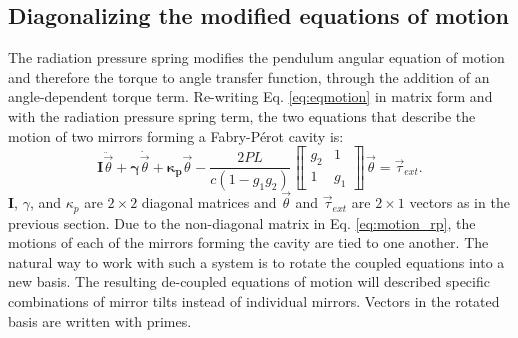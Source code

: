 \subsection{Diagonalizing the modified equations of motion}
The radiation pressure spring modifies the pendulum angular equation
of motion and therefore the torque to angle transfer function,
through the addition of an angle-dependent torque term. Re-writing
Eq. \ref{eq:eqmotion} in matrix form and with the radiation pressure
spring term, the two equations that describe the motion of two mirrors
forming a Fabry-P\'{e}rot cavity is: 
\begin{equation}
\mathbf{I} \ddot{\vec{\theta}} 
+ {\bm \gamma} \dot{\vec{\theta}} 
+ \mathbf{\kappa_p} \vec{\theta}
- \frac{2 P L}{c (1-g_1 g_2)}
\left\llbracket \begin{array}{cc}
g_2 & 1\\
1 & g_1\end{array} \right\rrbracket \vec{\theta} 
= \vec{\tau}_{ext}.
\label{eq:motion_rp}
\end{equation}
$\mathbf{I}$, $\gamma$, and $\kappa_p$ are $2 \times 2$ diagonal
matrices and $\vec{\theta}$ and $\vec{\tau}_{ext}$ are $2 \times 1$
vectors as in the previous section. Due to the non-diagonal matrix in
Eq. \ref{eq:motion_rp}, the motions of each of the mirrors forming the
cavity are tied to one another. The natural way to work with such a
system is to rotate the coupled equations into a new basis. The
resulting de-coupled equations of motion will described specific
combinations of mirror tilts instead of individual mirrors. Vectors in
the rotated basis are written with primes.

